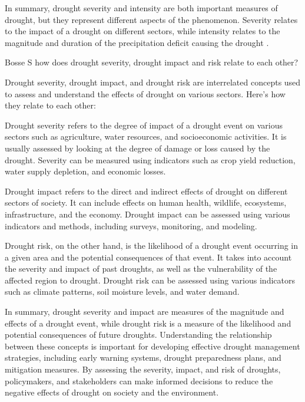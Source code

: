 {In summary, drought severity and intensity are both important measures of drought, but they represent different aspects of the phenomenon. Severity relates to the impact of a drought on different sectors, while intensity relates to the magnitude and duration of the precipitation deficit causing the drought \autocite{rcrcFORECASTBASEDFINANCINGEARLY2020,vereintenationenSpecialReportDrought2021}.




Bosse S
how does drought severity, drought impact and risk relate to each other?

Drought severity, drought impact, and drought risk are interrelated concepts used to assess and understand the effects of drought on various sectors. Here's how they relate to each other:

Drought severity refers to the degree of impact of a drought event on various sectors such as agriculture, water resources, and socioeconomic activities. It is usually assessed by looking at the degree of damage or loss caused by the drought. Severity can be measured using indicators such as crop yield reduction, water supply depletion, and economic losses.

Drought impact refers to the direct and indirect effects of drought on different sectors of society. It can include effects on human health, wildlife, ecosystems, infrastructure, and the economy. Drought impact can be assessed using various indicators and methods, including surveys, monitoring, and modeling.

Drought risk, on the other hand, is the likelihood of a drought event occurring in a given area and the potential consequences of that event. It takes into account the severity and impact of past droughts, as well as the vulnerability of the affected region to drought. Drought risk can be assessed using various indicators such as climate patterns, soil moisture levels, and water demand.

In summary, drought severity and impact are measures of the magnitude and effects of a drought event, while drought risk is a measure of the likelihood and potential consequences of future droughts. Understanding the relationship between these concepts is important for developing effective drought management strategies, including early warning systems, drought preparedness plans, and mitigation measures. By assessing the severity, impact, and risk of droughts, policymakers, and stakeholders can make informed decisions to reduce the negative effects of drought on society and the environment.




}
